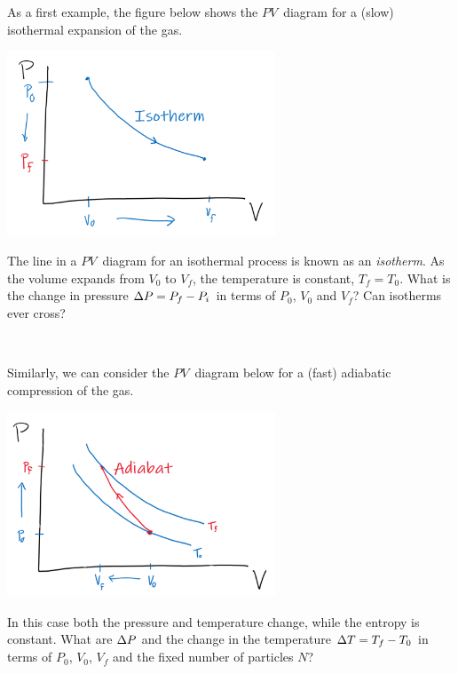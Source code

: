 As a first example, the figure below shows the $PV$~diagram for a (slow) isothermal expansion of the gas.
\begin{center}
  \includegraphics[width=0.6\textwidth]{figs/week05_isotherm.pdf}
\end{center}
\newpage %
\noindent The line in a $PV$~diagram for an isothermal process is known as an \textit{isotherm}.
As the volume expands from $V_0$ to $V_f$, the temperature is constant, $T_f = T_0$.
What is the change in pressure $\Delta P = P_f - P_i$ in terms of $P_0$, $V_0$ and $V_f$?
Can isotherms ever cross?
\begin{mdframed}
  \ \\[100 pt]
\end{mdframed}

Similarly, we can consider the $PV$~diagram below for a (fast) adiabatic compression of the gas.
\begin{center}
  \includegraphics[width=0.6\textwidth]{figs/week05_adiabat.pdf}
\end{center}
In this case both the pressure and temperature change, while the entropy is constant.
What are $\Delta P$ and the change in the temperature $\Delta T = T_f - T_0$ in terms of $P_0$, $V_0$, $V_f$ and the fixed number of particles $N$?
\begin{mdframed}
  \ \\[100 pt]
\end{mdframed}



